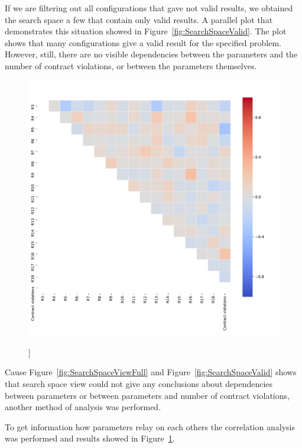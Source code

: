 If we are filtering out all configurations that gave not valid results, we obtained the search space a few that contain only valid results. A parallel plot that demonstrates this situation showed in Figure~\ref{fig:SearchSpaceValid}. The plot shows that many configurations give a valid result for the specified problem. However, still, there are no visible dependencies between the parameters and the number of contract violations, or between the parameters themselves.

\begin{figure}
	\centering
	\includegraphics[width=\textwidth]{images/CorrelationAnalysis.pdf}
	\caption[]]{}
	\label{fig:CorrelationAnalysis}
\end{figure}

Cause Figure~\ref{fig:SearchSpaceViewFull} and Figure~\ref{fig:SearchSpaceValid} shows that search space view could not give any conclusions about dependencies between parameters or between parameters and number of contract violations, another method of analysis was performed.

To get information how parameters relay on each others the correlation analysis was performed and results showed in Figure~\ref{fig:CorrelationAnalysis}.



